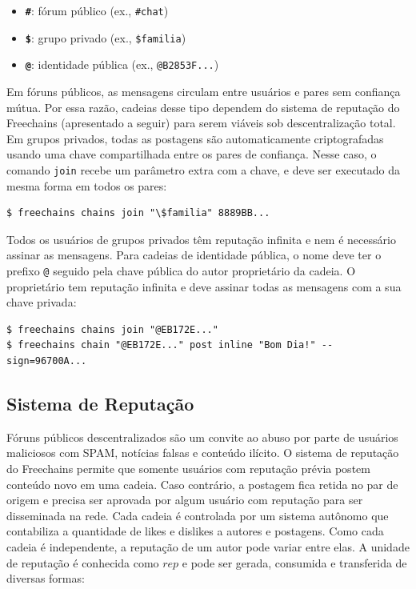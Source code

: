 \documentclass[12pt]{article}
\newcommand{\FC} {Freechains\xspace}
\begin{document}
\begin{itemize}
    \item \textbf{\texttt{\#}}: fórum público (ex., \texttt{\#chat})
    \item \textbf{\texttt{\$}}: grupo privado (ex., \texttt{\$familia})
    \item \textbf{\texttt{@}}: identidade pública (ex., \texttt{@B2853F...})
\end{itemize}

Em fóruns públicos, as mensagens circulam entre usuários e pares sem confiança
mútua.
Por essa razão, cadeias desse tipo dependem do sistema de reputação do \FC
(apresentado a seguir) para serem viáveis sob descentralização total.
%
Em grupos privados, todas as postagens são automaticamente criptografadas
usando uma chave compartilhada entre os pares de confiança.
Nesse caso, o comando \texttt{join} recebe um parâmetro extra com a chave, e
deve ser executado da mesma forma em todos os pares:

{\footnotesize
\begin{verbatim}
$ freechains chains join "\$familia" 8889BB...
\end{verbatim}
}

Todos os usuários de grupos privados têm reputação infinita e nem é necessário
assinar as mensagens.
%
Para cadeias de identidade pública, o nome deve ter o prefixo \texttt{@}
seguido pela chave pública do autor proprietário da cadeia.
O proprietário tem reputação infinita e deve assinar todas as mensagens com a
sua chave privada:

{\footnotesize
\begin{verbatim}
$ freechains chains join "@EB172E..."
$ freechains chain "@EB172E..." post inline "Bom Dia!" --sign=96700A...
\end{verbatim}
}

\subsection{Sistema de Reputação}
\label{sec.freechains.reps}

Fóruns públicos descentralizados são um convite ao abuso por parte de usuários
maliciosos com SPAM, notícias falsas e conteúdo ilícito.
O sistema de reputação do \FC permite que somente usuários com reputação prévia
postem conteúdo novo em uma cadeia.
Caso contrário, a postagem fica retida no par de origem e precisa ser aprovada
por algum usuário com reputação para ser disseminada na rede.
Cada cadeia é controlada por um sistema autônomo que contabiliza a quantidade
de likes e dislikes a autores e postagens.
Como cada cadeia é independente, a reputação de um autor pode variar entre
elas.
A unidade de reputação é conhecida como $rep$ e pode ser gerada, consumida e
transferida de diversas formas:
\end{document}
